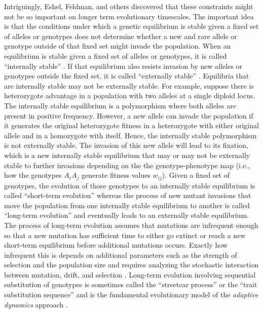 \documentclass[11pt]{article}
\begin{document}
Intriguingly, Eshel, Feldman, and others discovered that these constraints might not be so important on longer term evolutionary timescales. The important idea is that the conditions under which a genetic equilibrium is stable given a fixed set of alleles or genotypes does not determine whether a new and rare allele or genotype outside of that fixed set might invade the population. When an equilibrium is stable given a fixed set of alleles or genotypes, it is called ``internally stable'' \cite{Eshel:1996}. If that equilibrium also resists invasion by new alleles or genotypes outside the fixed set, it is called ``externally stable'' \cite{Liberman:1988,Eshel:1996}. Equilibria that are internally stable may not be externally stable. For example, suppose there is heterozygote advantage in a population with two alleles at a single diploid locus. The internally stable equilibrium is a polymorphism where both alleles are present in positive frequency. However, a new allele can invade the population if it generates the original heterozygote fitness in a heterozygote with either original allele and in a homozygote with itself. Hence, the internally stable polymorphism is not externally stable. The invasion of this new allele will lead to its fixation, which is a new internally stable equilibrium that may or may not be externally stable to further invasions depending on the the genotype-phenotype map (i.e., how the genotypes $A_{i} A_{j}$ generate fitness values $w_{ij}$). Given a fixed set of genotypes, the evolution of those genotypes to an internally stable equilibrium is called ``short-term evolution'' whereas the process of new mutant invasions that move the population from one internally stable equilibrium to another is called ``long-term evolution'' \cite{Eshel:1991,Eshel:1996,Hammerstein:1996,Weissing:1996,Eshel:Feldman:1998,VanCleve:2015,VanCleve:2020} and eventually leads to an externally stable equilibrium. The process of long-term evolution assumes that mutations are infrequent enough so that a new mutation has sufficient time to either go extinct or reach a new short-term equilibrium before additional mutations occurs. Exactly how infrequent this is depends on additional parameters such as the strength of selection and the population size and requires analyzing the stochastic interaction between mutation, drift, and selection \cite{Gillespie:1991,Champagnat:2006,Champagnat:Ferriere:2006,Desai:Fisher:2007}. Long-term evolution involving sequential substitution of genotypes is sometimes called the ``streetcar process'' \cite{Hammerstein:1996} or the ``trait substitution sequence'' \cite{Metz:Nisbet:1992,Dieckmann:Law:1996,Champagnat:Ferriere:2001} and is the fundamental evolutionary model of the \textit{adaptive dynamics} approach \cite{Metz:Geritz:1996,Geritz:Kisdi:1998,Dercole:Rinaldi:2008}.
\end{document}
